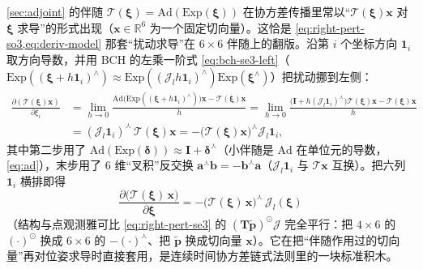 \begin{derivation}\label{deriv:Ad-deriv}
\cref{sec:adjoint} 的伴随 $\boldsymbol{\mathcal{T}}(\boldsymbol{\xi})=\mathrm{Ad}(\mathrm{Exp}(\boldsymbol{\xi}))$ 在协方差传播里常以“$\boldsymbol{\mathcal{T}}(\boldsymbol{\xi})\mathbf{x}$ 对 $\boldsymbol{\xi}$ 求导”的形式出现（$\mathbf{x}\in\mathbb{R}^6$ 为一个固定切向量）。这恰是 \cref{eq:right-pert-so3,eq:deriv-model} 那套“扰动求导”在 $6\times6$ 伴随上的翻版\cite{barfoot2024state}。沿第 $i$ 个坐标方向 $\mathbf{1}_i$ 取方向导数，并用 BCH 的左乘一阶式 \cref{eq:bch-se3-left}（$\mathrm{Exp}((\boldsymbol{\xi}+h\mathbf{1}_i)^\wedge)\approx\mathrm{Exp}((\boldsymbol{\mathcal{J}}_l h\mathbf{1}_i)^\wedge)\mathrm{Exp}(\boldsymbol{\xi}^\wedge)$）把扰动挪到左侧：
\begin{align*}
  \frac{\partial(\boldsymbol{\mathcal{T}}(\boldsymbol{\xi})\mathbf{x})}{\partial\xi_i}
  &=\lim_{h\to0}\frac{\mathrm{Ad}\big(\mathrm{Exp}((\boldsymbol{\xi}+h\mathbf{1}_i)^\wedge)\big)\mathbf{x}-\boldsymbol{\mathcal{T}}(\boldsymbol{\xi})\mathbf{x}}{h}
   =\lim_{h\to0}\frac{\big(\mathbf{I}+h(\boldsymbol{\mathcal{J}}_l\mathbf{1}_i)^\curlywedge\big)\boldsymbol{\mathcal{T}}(\boldsymbol{\xi})\mathbf{x}-\boldsymbol{\mathcal{T}}(\boldsymbol{\xi})\mathbf{x}}{h}\\
  &=(\boldsymbol{\mathcal{J}}_l\mathbf{1}_i)^\curlywedge\,\boldsymbol{\mathcal{T}}(\boldsymbol{\xi})\mathbf{x}
   =-\big(\boldsymbol{\mathcal{T}}(\boldsymbol{\xi})\mathbf{x}\big)^\curlywedge\boldsymbol{\mathcal{J}}_l\mathbf{1}_i,
\end{align*}
其中第二步用了 $\mathrm{Ad}(\mathrm{Exp}(\boldsymbol{\delta}))\approx\mathbf{I}+\boldsymbol{\delta}^\curlywedge$（小伴随是 $\mathrm{Ad}$ 在单位元的导数，\cref{eq:ad}），末步用了 $6$ 维“叉积”反交换 $\mathbf{a}^\curlywedge\mathbf{b}=-\mathbf{b}^\curlywedge\mathbf{a}$（$\boldsymbol{\mathcal{J}}_l\mathbf{1}_i$ 与 $\boldsymbol{\mathcal{T}}\mathbf{x}$ 互换）。把六列 $\mathbf{1}_i$ 横排即得
\begin{equation}
  \boxed{\;\frac{\partial\big(\boldsymbol{\mathcal{T}}(\boldsymbol{\xi})\,\mathbf{x}\big)}{\partial\boldsymbol{\xi}}
  =-\big(\boldsymbol{\mathcal{T}}(\boldsymbol{\xi})\,\mathbf{x}\big)^\curlywedge\,\boldsymbol{\mathcal{J}}_l(\boldsymbol{\xi})\;}
  \label{eq:Ad-deriv}
\end{equation}
（结构与点观测雅可比 \cref{eq:right-pert-se3} 的 $(\mathbf{T}\tilde{\mathbf{p}})^\odot\boldsymbol{\mathcal{J}}$ 完全平行：把 $4\times6$ 的 $(\cdot)^\odot$ 换成 $6\times6$ 的 $-(\cdot)^\curlywedge$、把 $\tilde{\mathbf{p}}$ 换成切向量 $\mathbf{x}$）。它在把“伴随作用过的切向量”再对位姿求导时直接套用，是连续时间协方差链式法则里的一块标准积木。
\end{derivation}

